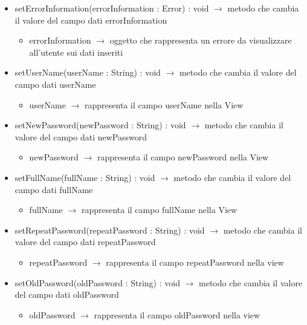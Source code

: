 \begin{description}
\begin{itemize}
	\item setErrorInformation(errorInformation : Error) : void $\rightarrow$ metodo che cambia il valore del campo dati errorInformation\begin{itemize}
		\item errorInformation $\rightarrow$ oggetto che rappresenta un errore da visualizzare all'utente sui dati inseriti
	\end{itemize}
	
	\item setUserName(userName : String) : void $\rightarrow$ metodo che cambia il valore del campo dati userName\begin{itemize}
		\item userName $\rightarrow$ rappresenta il campo userName nella View
	\end{itemize}
	
	\item setNewPassword(newPassword : String) : void $\rightarrow$ metodo che cambia il valore del campo dati newPassword\begin{itemize}
		\item newPassword $\rightarrow$ rappresenta il campo newPassword nella View	
	\end{itemize}
	
	\item setFullName(fullName : String) : void $\rightarrow$ metodo che cambia il valore del campo dati fullName\begin{itemize}
		\item fullName $\rightarrow$ rappresenta il campo fullName nella View
	\end{itemize}
	
	\item setRepeatPassword(repeatPassword : String) : void $\rightarrow$ metodo che cambia il valore del campo dati repeatPassword\begin{itemize}
		\item repeatPassword $\rightarrow$ rappresenta il campo repeatPassword nella view	
	\end{itemize}
	
	\item setOldPassword(oldPassword : String) : void $\rightarrow$ metodo che cambia il valore del campo dati oldPassword\begin{itemize}
		\item oldPassword $\rightarrow$ rappresenta il campo oldPassword nella view
	\end{itemize}
	

\end{itemize}
\end{description}
